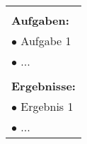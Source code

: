 \begin{table}[!h]
\begin{center}
\begin{tabular}{|p{35mm}||p{55mm}|p{50mm}||p{40mm}|}
   \multicolumn{4}{|p{150mm}|}{}\\
   \multicolumn{4}{|p{150mm}|}{\textbf{Aufgaben:}}\\
   \multicolumn{4}{|p{150mm}|}{$\bullet$ Aufgabe 1}\\
   \multicolumn{4}{|p{150mm}|}{$\bullet$ ...}\\
   \multicolumn{4}{|p{150mm}|}{}\\
   \multicolumn{4}{|p{150mm}|}{\textbf{Ergebnisse:}}\\
   \multicolumn{4}{|p{150mm}|}{$\bullet$ Ergebnis 1}\\
   \multicolumn{4}{|p{150mm}|}{$\bullet$ ...}\\
   \hline
  \end{tabular}
 \end{center}
\end{table}

